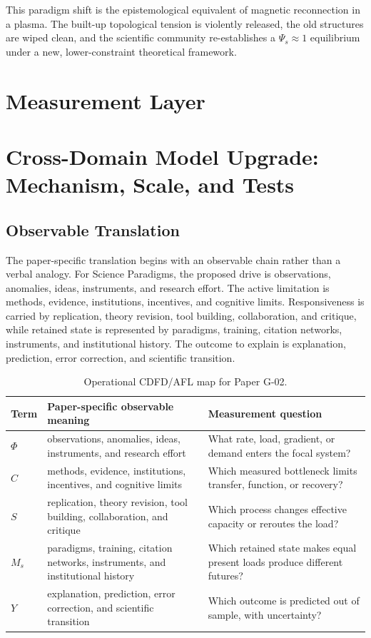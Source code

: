 \documentclass[11pt,a4paper]{article}
\begin{document}
This paradigm shift is the epistemological equivalent of magnetic reconnection in a plasma. The built-up topological tension is violently released, the old structures are wiped clean, and the scientific community re-establishes a $\Psi_s \approx 1$ equilibrium under a new, lower-constraint theoretical framework.



\section{Measurement Layer}

\section{Cross-Domain Model Upgrade: Mechanism, Scale, and Tests}

\subsection{Observable Translation}

The paper-specific translation begins with an observable chain rather than a
verbal analogy. For Science Paradigms, the proposed drive is observations, anomalies, ideas, instruments, and research effort.
The active limitation is methods, evidence, institutions, incentives, and cognitive limits. Responsiveness is carried by
replication, theory revision, tool building, collaboration, and critique, while retained state is represented by
paradigms, training, citation networks, instruments, and institutional history. The outcome to explain is explanation, prediction, error correction, and scientific transition.

\begin{table}[htbp]
\centering
\small
\caption{Operational CDFD/AFL map for Paper G-02.}
\begin{tabularx}{\textwidth}{|l|X|X|}
\hline
\textbf{Term} & \textbf{Paper-specific observable meaning} & \textbf{Measurement question} \\
\hline
$\Phi$ & observations, anomalies, ideas, instruments, and research effort & What rate, load, gradient, or demand enters the focal system? \\
\hline
$C$ & methods, evidence, institutions, incentives, and cognitive limits & Which measured bottleneck limits transfer, function, or recovery? \\
\hline
$S$ & replication, theory revision, tool building, collaboration, and critique & Which process changes effective capacity or reroutes the load? \\
\hline
$M_s$ & paradigms, training, citation networks, instruments, and institutional history & Which retained state makes equal present loads produce different futures? \\
\hline
$Y$ & explanation, prediction, error correction, and scientific transition & Which outcome is predicted out of sample, with uncertainty? \\
\hline
\end{tabularx}
\end{table}
\end{document}
